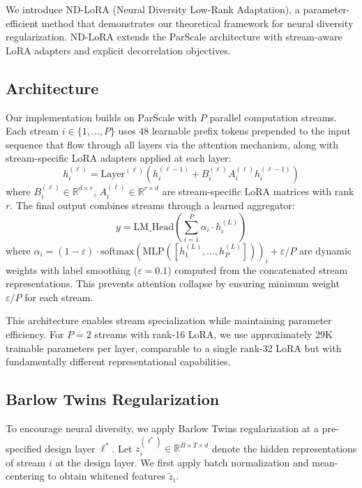 \documentclass{article} %
\begin{document}
We introduce ND-LoRA (Neural Diversity Low-Rank Adaptation), a parameter-efficient method that demonstrates our
theoretical framework for neural diversity regularization. ND-LoRA extends the ParScale architecture with
stream-aware LoRA adapters and explicit decorrelation objectives.

\subsection{Architecture}
Our implementation builds on ParScale with $P$ parallel computation streams. Each stream $i \in \{1,
\ldots, P\}$ uses 48 learnable prefix tokens prepended to the input sequence that flow through all layers
via the attention mechanism, along with stream-specific LoRA adapters applied at each layer:
\begin{equation}
  h_i^{(\ell)} = \text{Layer}^{(\ell)}(h_i^{(\ell-1)} + B_i^{(\ell)} A_i^{(\ell)} h_i^{(\ell-1)})
\end{equation}
where $B_i^{(\ell)} \in \mathbb{R}^{d \times r}$, $A_i^{(\ell)} \in \mathbb{R}^{r \times d}$ are stream-specific
LoRA matrices with rank $r$. The final output combines streams through a learned aggregator:
\begin{equation}
  y = \text{LM\_Head}\left(\sum_{i=1}^P \alpha_i \cdot h_i^{(L)}\right)
\end{equation}
where $\alpha_i = (1-\varepsilon) \cdot \text{softmax}(\text{MLP}([h_1^{(L)}, \ldots, h_P^{(L)}]))_i +
\varepsilon/P$ are dynamic weights with
label smoothing ($\varepsilon = 0.1$) computed from the concatenated stream representations.
This prevents attention collapse by ensuring minimum weight $\varepsilon/P$ for each stream.

This architecture enables stream specialization while maintaining parameter efficiency. For $P=2$ streams
with rank-16 LoRA, we use approximately 29K trainable parameters per layer, comparable to a single rank-32
LoRA but with fundamentally different representational capabilities.

\subsection{Barlow Twins Regularization}
To encourage neural diversity, we apply Barlow Twins regularization at a pre-specified design layer $\ell^*$. Let
$z_i^{(\ell^*)} \in \mathbb{R}^{B \times T \times d}$ denote the hidden representations of stream $i$ at the
design layer. We first apply batch normalization and mean-centering to obtain whitened features $\tilde{z}_i$.
\end{document}
